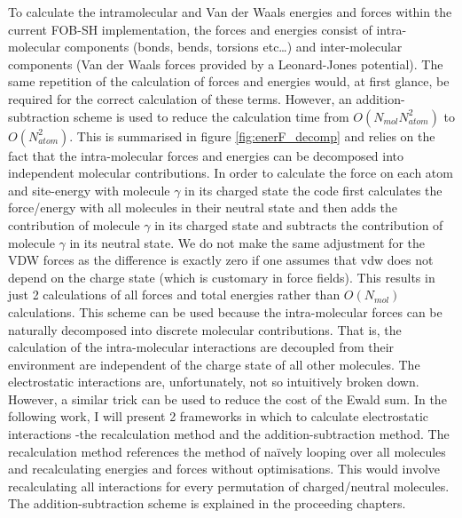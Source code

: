 To calculate the intramolecular and Van der Waals energies and forces within the current FOB-SH implementation, the forces and energies consist of intra-molecular components (bonds, bends, torsions etc\ldots) and inter-molecular components (Van der Waals forces provided by a Leonard-Jones potential). The same repetition of the calculation of forces and energies would, at first glance, be required for the correct calculation of these terms. However, an addition-subtraction scheme is used to reduce the calculation time from $O(N_{mol} N_{atom}^2)$ to $O(N_{atom}^2)$. This is summarised in figure \ref{fig:enerF_decomp} and relies on the fact that the intra-molecular forces and energies can be decomposed into independent molecular contributions. In order to calculate the force on each atom and site-energy with molecule $\gamma$ in its charged state the code first calculates the force/energy with all molecules in their neutral state and then adds the contribution of molecule $\gamma$ in its charged state and subtracts the contribution of molecule $\gamma$ in its neutral state. We do not make the same adjustment for the VDW forces as the difference is exactly zero if one assumes that vdw does not depend on the charge state (which is customary in force fields). This results in just 2 calculations of all forces and total energies rather than $O(N_{mol})$ calculations. This scheme can be used because the intra-molecular forces can be naturally decomposed into discrete molecular contributions. That is, the calculation of the intra-molecular interactions are decoupled from their environment are independent of the charge state of all other molecules. The electrostatic interactions are, unfortunately, not so intuitively broken down. However, a similar trick can be used to reduce the cost of the Ewald sum. In the following work, I will present 2 frameworks in which to calculate electrostatic interactions -the recalculation method and the addition-subtraction method. The recalculation method references the method of na\"ively looping over all molecules and recalculating energies and forces without optimisations. This would involve recalculating all interactions for every permutation of charged/neutral molecules. The addition-subtraction scheme is explained in the proceeding chapters.
